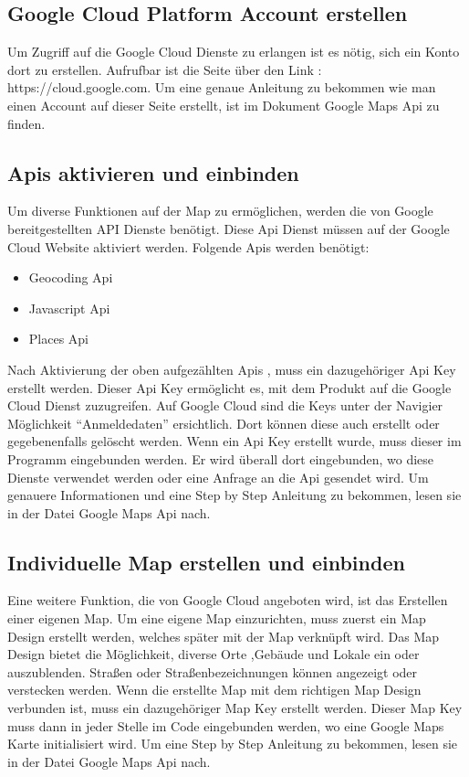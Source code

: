 \subsection{Google Cloud Platform Account erstellen}
Um Zugriff auf die Google Cloud Dienste zu erlangen ist es nötig, sich ein Konto dort zu erstellen. Aufrufbar ist die Seite über den Link : https://cloud.google.com.  Um eine genaue Anleitung zu bekommen wie man einen Account auf dieser Seite erstellt, ist im Dokument Google Maps Api zu finden.

\subsection{Apis aktivieren und einbinden}
Um diverse Funktionen auf der Map zu ermöglichen, werden die von Google bereitgestellten API Dienste benötigt.  Diese Api Dienst müssen auf der Google Cloud Website aktiviert werden. Folgende Apis werden benötigt:
\begin{itemize}
	\item Geocoding Api 
	\item Javascript Api
	\item Places Api  
\end{itemize}
Nach Aktivierung der oben aufgezählten Apis , muss ein dazugehöriger Api Key erstellt werden. Dieser Api Key ermöglicht es, mit dem Produkt auf die Google Cloud Dienst zuzugreifen. Auf Google Cloud sind die Keys unter der Navigier Möglichkeit  “Anmeldedaten” ersichtlich. Dort können diese auch  erstellt oder gegebenenfalls gelöscht werden. Wenn ein Api Key erstellt wurde, muss dieser im Programm eingebunden werden. Er wird überall dort eingebunden, wo diese Dienste verwendet werden oder eine Anfrage an die Api gesendet wird. Um genauere Informationen und eine Step by Step Anleitung zu bekommen, lesen sie in der Datei Google Maps Api nach.

\newpage
\subsection{Individuelle Map erstellen und einbinden}
Eine weitere Funktion, die von Google Cloud angeboten wird, ist das Erstellen einer eigenen Map. 
Um eine eigene Map einzurichten, muss zuerst ein Map Design erstellt werden, welches später mit der Map verknüpft wird. Das Map Design bietet die Möglichkeit, diverse Orte ,Gebäude und Lokale  ein oder auszublenden. Straßen oder Straßenbezeichnungen können angezeigt oder verstecken werden. Wenn die erstellte Map mit dem richtigen Map Design verbunden ist, muss ein dazugehöriger Map Key erstellt werden. Dieser Map Key muss dann in jeder Stelle im Code eingebunden werden, wo eine Google Maps Karte initialisiert wird. Um eine Step by Step Anleitung zu bekommen, lesen sie in der Datei Google Maps Api nach.



